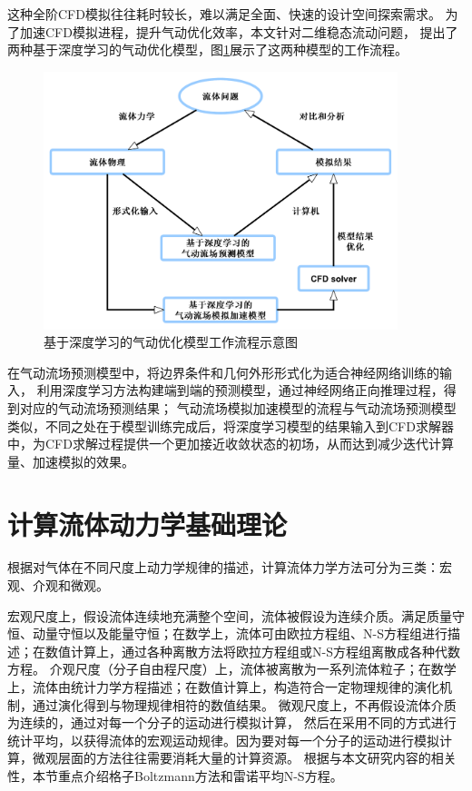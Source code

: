 这种全阶CFD模拟往往耗时较长，难以满足全面、快速的设计空间探索需求。
为了加速CFD模拟进程，提升气动优化效率，本文针对二维稳态流动问题，
提出了两种基于深度学习的气动优化模型，图\ref{fig:cfd_dnnflow}展示了这两种模型的工作流程。

\begin{figure}[htp]
	\centering
	\includegraphics[width=0.92\textwidth]{figures/cfd_dnnflow.pdf}
	\caption{基于深度学习的气动优化模型工作流程示意图}
	\label{fig:cfd_dnnflow}
\end{figure}

在气动流场预测模型中，将边界条件和几何外形形式化为适合神经网络训练的输入，
利用深度学习方法构建端到端的预测模型，通过神经网络正向推理过程，得到对应的气动流场预测结果；
气动流场模拟加速模型的流程与气动流场预测模型类似，不同之处在于模型训练完成后，将深度学习模型的结果输入到CFD求解器中，为CFD求解过程提供一个更加接近收敛状态的初场，从而达到减少迭代计算量、加速模拟的效果。



\section{计算流体动力学基础理论}
根据对气体在不同尺度上动力学规律的描述，计算流体力学方法可分为三类：宏观、介观和微观。

宏观尺度上，假设流体连续地充满整个空间，流体被假设为连续介质。满足质量守恒、动量守恒以及能量守恒；在数学上，流体可由欧拉方程组、N-S方程组进行描述；在数值计算上，通过各种离散方法将欧拉方程组或N-S方程组离散成各种代数方程。
介观尺度（分子自由程尺度）上，流体被离散为一系列流体粒子；在数学上，流体由统计力学方程描述；在数值计算上，构造符合一定物理规律的演化机制，通过演化得到与物理规律相符的数值结果。
微观尺度上，不再假设流体介质为连续的，通过对每一个分子的运动进行模拟计算，
然后在采用不同的方式进行统计平均，以获得流体的宏观运动规律。因为要对每一个分子的运动进行模拟计算，微观层面的方法往往需要消耗大量的计算资源。
根据与本文研究内容的相关性，本节重点介绍格子Boltzmann方法和雷诺平均N-S方程。




